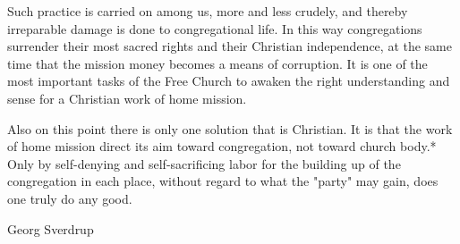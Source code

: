 Such practice is carried on among us, more and less crudely, and thereby irreparable damage is done to congregational life. In this way congregations surrender their most sacred rights and their Christian independence, at the same time that the mission money becomes a means of corruption. It is one of the most important tasks of the Free Church to awaken the right understanding and sense for a Christian work of home mission.

Also on this point there is only one solution that is Christian. It is that the work of home mission direct its aim toward congregation, not toward church body.* Only by self-denying and self-sacrificing labor for the building up of the congregation in each place, without regard to what the "party" may gain, does one truly do any good.

Georg Sverdrup
